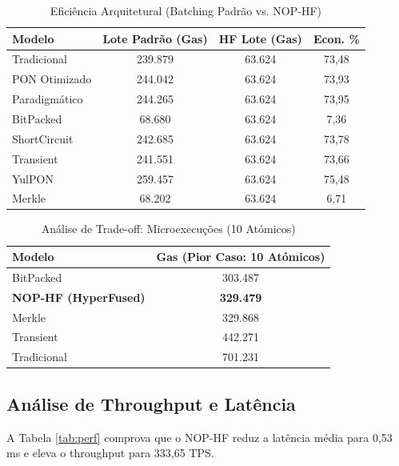 \documentclass[conference]{IEEEtran}
\begin{document}
\begin{table}[htbp]
\caption{Eficiência Arquitetural (Batching Padrão vs. NOP-HF)}
\begin{center}
\begin{tabular}{|l|c|c|c|}
\hline
\textbf{Modelo} & \textbf{Lote Padrão (Gas)} & \textbf{HF Lote (Gas)} & \textbf{Econ. \%} \\
\hline
Tradicional   & 239.879 & 63.624 & 73,48 \\
PON Otimizado & 244.042 & 63.624 & 73,93 \\
Paradigmático & 244.265 & 63.624 & 73,95 \\
BitPacked     & 68.680  & 63.624 & 7,36  \\
ShortCircuit  & 242.685 & 63.624 & 73,78 \\
Transient     & 241.551 & 63.624 & 73,66 \\
YulPON        & 259.457 & 63.624 & 75,48 \\
Merkle        & 68.202  & 63.624 & 6,71  \\
\hline
\end{tabular}
\label{tab:arch}
\end{center}
\end{table}

\begin{table}[htbp]
\caption{Análise de Trade-off: Microexecuções (10 Atómicos)}
\begin{center}
\begin{tabular}{|l|c|}
\hline
\textbf{Modelo} & \textbf{Gas (Pior Caso: 10 Atómicos)} \\
\hline
BitPacked        & 303.487 \\
\textbf{NOP-HF (HyperFused)} & \textbf{329.479} \\
Merkle           & 329.868 \\
Transient        & 442.271 \\
Tradicional      & 701.231 \\
\hline
\end{tabular}
\label{tab:tradeoff}
\end{center}
\end{table}

\subsection{Análise de Throughput e Latência}

A Tabela \ref{tab:perf} comprova que o NOP-HF reduz a latência média para 0,53 ms e eleva o throughput para 333,65 TPS.
\end{document}
